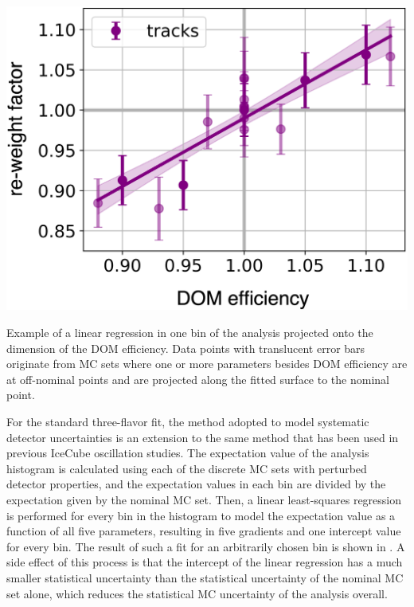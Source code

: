 \begin{marginfigure}[\baselineskip]
    \includegraphics[width=\linewidth]{figures/measurement/systematics/detector/hypersurface_example_v2.png}
    \caption{Example of a linear regression in one bin of the analysis projected onto the dimension of the DOM efficiency. Data points with translucent error bars originate from MC sets where one or more parameters besides DOM efficiency are at off-nominal points and are projected along the fitted surface to the nominal point.}
\end{marginfigure}
For the standard three-flavor fit, the method adopted to model systematic detector uncertainties is an extension to the same method that has been used in previous IceCube oscillation studies\cite{IceCube:2019dqi}. The expectation value of the analysis histogram is calculated using each of the discrete MC sets with perturbed detector properties, and the expectation values in each bin are divided by the expectation given by the nominal MC set. Then, a linear least-squares regression is performed for every bin in the histogram to model the expectation value as a function of all five parameters, resulting in five gradients and one intercept value for every bin. The result of such a fit for an arbitrarily chosen bin is shown in . A side effect of this process is that the intercept of the linear regression has a much smaller statistical uncertainty than the statistical uncertainty of the nominal MC set alone, which reduces the statistical MC uncertainty of the analysis overall.

